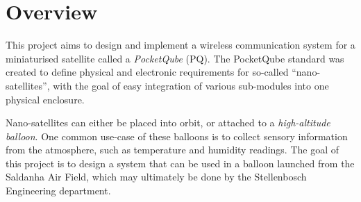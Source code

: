 \graphicspath{{./figures}}

\section{Overview}

This project aims to design and implement a wireless communication system for a miniaturised satellite called a \textit{PocketQube} (PQ). The PocketQube standard was created to define physical and electronic requirements for so-called ``nano-satellites'', with the goal of easy integration of various sub-modules into one physical enclosure.

Nano-satellites can either be placed into orbit, or attached to a \textit{high-altitude balloon}. One common use-case of these balloons is to collect sensory information from the atmosphere, such as temperature and humidity readings. The goal of this project is to design a system that can be used in a balloon launched from the Saldanha Air Field, which may ultimately be done by the Stellenbosch Engineering department.


